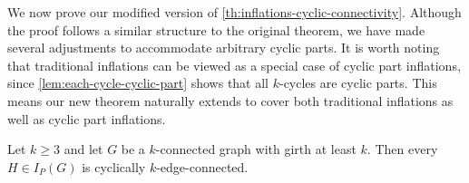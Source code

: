 \documentclass[12pt, twoside]{book}
\begin{document}
We now prove our modified version of \cref{th:inflations-cyclic-connectivity}. Although the proof follows a similar structure to the original theorem, we have made several adjustments to accommodate arbitrary cyclic parts. It is worth noting that traditional inflations can be viewed as a special case of cyclic part inflations, since \cref{lem:each-cycle-cyclic-part} shows that all $k$-cycles are cyclic parts. This means our new theorem naturally extends to cover both traditional inflations as well as cyclic part inflations.


\begin{theorem}\label{th:cyclic-part-inflations}
	Let $k\geq 3$ and let $G$ be a $k$-connected graph with girth at least $k$. Then every  $H\in I_P(G)$ is cyclically $k$-edge-connected.
\end{theorem}
\end{document}
